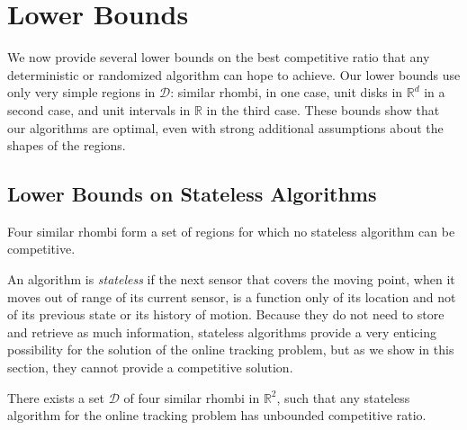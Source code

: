 \documentclass[runningheads]{llncs}
\newcommand {\mathset} [1] {\ensuremath {\mathbb {#1}}}
\newcommand {\R} {\mathset {R}}
\newcommand {\script} [1] {\ensuremath {\mathcal {#1}}}
\begin{document}
\section {Lower Bounds} \label {sec:lowerbounds}
  
We now provide several lower bounds on the best competitive ratio that any deterministic or randomized algorithm can hope to achieve. Our lower bounds use only very simple regions in $\script D$: similar rhombi, in one case, unit disks in $\R^d$ in a second case, and unit intervals in $\R$ in the third case. These bounds show that our algorithms are optimal, even with strong additional assumptions about the shapes of the regions.

\subsection{Lower Bounds on Stateless Algorithms}
 {Four similar rhombi form a set of regions for which no stateless algorithm can be competitive.}

An algorithm is \emph{stateless} if the next sensor that covers the moving point, when it moves out of range of its current sensor, is a function only of its location and not of its previous state or its history of motion. Because they do not need to store and retrieve as much information, stateless algorithms provide a very enticing possibility for the solution of the online tracking problem, but as we show in this section, they cannot provide a competitive solution.

\begin{theorem}  \label {thm:lowerbound_stateless}
There exists a set $\script D$ of four similar rhombi in $\R^2$, such that any stateless algorithm for the online tracking problem has unbounded competitive ratio.
\end{theorem}
\end{document}
